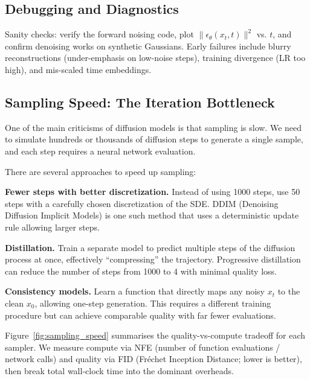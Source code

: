 \vspMed
\subsection{Debugging and Diagnostics}
Sanity checks: verify the forward noising code, plot $\|\epsilon_\theta(x_t,t)\|^2$ vs. $t$, and confirm denoising works on synthetic Gaussians. Early failures include blurry reconstructions (under-emphasis on low-noise steps), training divergence (LR too high), and mis-scaled time embeddings.
\label{sec:practical}

\vspBlock

\subsection{Sampling Speed: The Iteration Bottleneck}

One of the main criticisms of diffusion models is that sampling is slow. We need to simulate hundreds or thousands of diffusion steps to generate a single sample, and each step requires a neural network evaluation.

\vspPara

There are several approaches to speed up sampling:

\vspPara

\textbf{Fewer steps with better discretization.} Instead of using 1000 steps, use 50 steps with a carefully chosen discretization of the SDE. DDIM (Denoising Diffusion Implicit Models) is one such method that uses a deterministic update rule allowing larger steps.

\vspPara

\textbf{Distillation.} Train a separate model to predict multiple steps of the diffusion process at once, effectively ``compressing'' the trajectory. Progressive distillation can reduce the number of steps from 1000 to 4 with minimal quality loss.

\vspPara

\textbf{Consistency models.} Learn a function that directly maps any noisy $x_t$ to the clean $x_0$, allowing one-step generation. This requires a different training procedure but can achieve comparable quality with far fewer evaluations.

\vspSection

Figure~\ref{fig:sampling_speed} summarises the quality-vs-compute tradeoff for each sampler. We measure compute via NFE (number of function evaluations / network calls) and quality via FID (Fr\'echet Inception Distance; lower is better), then break total wall-clock time into the dominant overheads.

